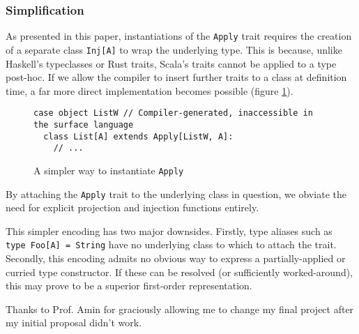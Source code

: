 \documentclass[acmsmall,screen]{acmart}
\begin{document}
\subsubsection{Simplification}

As presented in this paper, instantiations of the \texttt{Apply} trait requires
the creation of a separate class \texttt{Inj[A]} to wrap the underlying type.
This is because, unlike Haskell's typeclasses or Rust traits, Scala's traits
cannot be applied to a type post-hoc. If we allow the compiler to insert
further traits to a class at definition time, a far more direct implementation
becomes possible (figure \ref{fig::simple}).
\begin{figure}[ht]
  \begin{lstlisting}[style=scala]
  case object ListW // Compiler-generated, inaccessible in the surface language
  class List[A] extends Apply[ListW, A]:
    // ...
  \end{lstlisting}
  \caption{A simpler way to instantiate \texttt{Apply}}\label{fig::simple}
\end{figure}

By attaching the \texttt{Apply} trait to the underlying class in question, we
obviate the need for explicit projection and injection functions entirely.

This simpler encoding has two major downsides. Firstly, type aliases such as
\texttt{type~Foo[A]~=~String} have no underlying class to which to attach the
trait. Secondly, this encoding admits no obvious way to express a
partially-applied or curried type constructor. If these can be resolved (or
sufficiently worked-around), this may prove to be a superior first-order
representation.

\begin{acks}
  Thanks to Prof. Amin for graciously allowing me to change my final project
  after my initial proposal didn't work.
\end{acks}


\typeout{}

\end{document}
